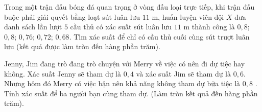 \begin{ex}%
	Trong một trận đấu bóng đá quan trọng ở vòng đấu loại trực tiếp, khi trận đấu buộc phải giải quyết bằng loạt sút luân lưu $11$ m, huấn luyện viên đội $X$ đưa danh sách lần lượt $5$ cầu thủ có xác suất sút luân lưu $11$ m thành công là $0{,}8$; $0{,}8$; $0{,}76$; $0{,}72$; $0{,}68$. Tìm xác suất để chỉ có cầu thủ cuối cùng sút trượt luân lưu (kết quả được làm tròn đến hàng phần trăm).
\end{ex}

\begin{ex}%
	Jenny, Jim đang trò đang trò chuyện với Merry về việc có nên đi dự tiệc hay không. Xác suất Jenny sẽ tham dự là $0{,}4$ và xác suất Jim sẽ tham dự là $0{,}6$. Nhưng hôm đó Merry có việc bận nên khả năng không tham dự bữa tiệc là $0{,}8$ . Tính xác suất để ba người bạn cùng tham dự. (Làm tròn kết quả đến hàng phần trăm).
\end{ex}

